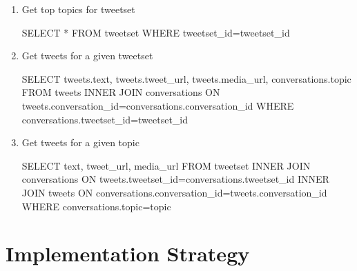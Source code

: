 \begin{enumerate}
\begin{algorithm}
\begin{algorithmic}
        \end{algorithmic}
    \end{algorithm}
    \item Get top topics for tweetset
    \begin{algorithm}
        \begin{algorithmic}
            \STATE SELECT * FROM tweetset WHERE tweetset\_id=tweetset\_id
        \end{algorithmic}
    \end{algorithm}
    \item Get tweets for a given tweetset
    \begin{algorithm}
        \begin{algorithmic}
            \STATE SELECT tweets.text, tweets.tweet\_url, tweets.media\_url, conversations.topic FROM tweets INNER JOIN conversations ON tweets.conversation\_id=conversations.conversation\_id WHERE conversations.tweetset\_id=tweetset\_id
        \end{algorithmic}
    \end{algorithm}
    \item Get tweets for a given topic
    \begin{algorithm}
        \begin{algorithmic}
            \STATE SELECT text, tweet\_url, media\_url FROM tweetset INNER JOIN conversations ON tweets.tweetset\_id=conversations.tweetset\_id INNER JOIN tweets ON conversations.conversation\_id=tweets.conversation\_id WHERE conversations.topic=topic
        \end{algorithmic}
    \end{algorithm}
\end{enumerate}
\section{Implementation Strategy}
